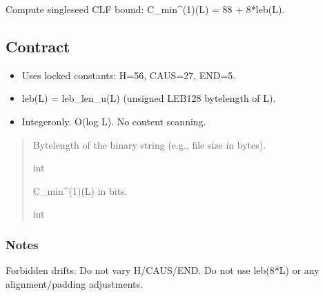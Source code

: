 \documentclass[letterpaper,10pt,english]{sphinxmanual}
\begin{document}
\begin{fulllineitems}
\label{\detokenize{clf_calculator:clf_calculator.clf_single_seed_cost}}
\pysigstartsignatures
\pysiglinewithargsret
{}
{}
{}
\pysigstopsignatures
\sphinxAtStartPar
Compute single\sphinxhyphen{}seed CLF bound: C\_min\textasciicircum{}(1)(L) = 88 + 8*leb(L).


\subsection{Contract}
\label{\detokenize{clf_calculator:id1}}\begin{itemize}
\item {} 
\sphinxAtStartPar
Uses locked constants: H=56, CAUS=27, END=5.

\item {} 
\sphinxAtStartPar
leb(L) = leb\_len\_u(L) (unsigned LEB128 byte\sphinxhyphen{}length of L).

\item {} 
\sphinxAtStartPar
Integer\sphinxhyphen{}only. O(log L). No content scanning.

\end{itemize}
\begin{quote}\begin{description}
\sphinxAtStartPar
{}

\sphinxAtStartPar
Byte\sphinxhyphen{}length of the binary string (e.g., file size in bytes).

\sphinxAtStartPar
int

\sphinxAtStartPar
C\_min\textasciicircum{}(1)(L) in bits.

\sphinxAtStartPar
int

\end{description}\end{quote}
\subsubsection*{Notes}

\sphinxAtStartPar
Forbidden drifts:
\sphinxhyphen{} Do not vary H/CAUS/END.
\sphinxhyphen{} Do not use leb(8*L) or any alignment/padding adjustments.

\end{fulllineitems}
\end{document}
